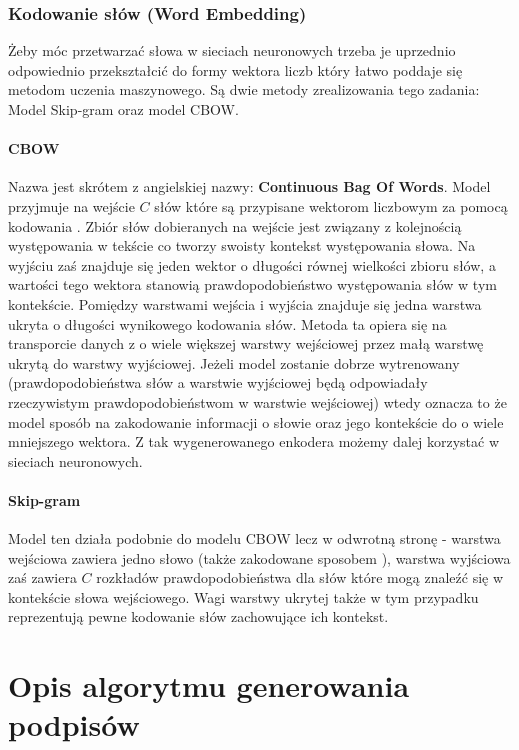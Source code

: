\subsubsection{Kodowanie słów (Word Embedding)}
Żeby móc przetwarzać słowa w sieciach neuronowych trzeba je uprzednio odpowiednio przekształcić do formy wektora liczb który łatwo poddaje się metodom uczenia maszynowego. Są dwie metody zrealizowania tego zadania: Model Skip-gram oraz model CBOW.
\paragraph{CBOW}
Nazwa jest skrótem z angielskiej nazwy: \textbf{Continuous Bag Of Words}.
Model przyjmuje na wejście $C$ słów które są przypisane wektorom liczbowym za pomocą kodowania . Zbiór słów dobieranych na wejście jest związany z kolejnością występowania w tekście co tworzy swoisty kontekst występowania słowa. Na wyjściu zaś znajduje się jeden wektor o długości równej wielkości zbioru słów, a wartości tego wektora stanowią prawdopodobieństwo występowania słów w tym kontekście. Pomiędzy warstwami wejścia i wyjścia znajduje się jedna warstwa ukryta o długości wynikowego kodowania słów. Metoda ta opiera się na transporcie danych z o wiele większej warstwy wejściowej przez małą warstwę ukrytą do warstwy wyjściowej. Jeżeli model zostanie dobrze wytrenowany (prawdopodobieństwa słów a warstwie wyjściowej będą odpowiadały rzeczywistym prawdopodobieństwom w warstwie wejściowej) wtedy oznacza to że model  sposób na zakodowanie informacji o słowie oraz jego kontekście do o wiele mniejszego wektora. Z tak wygenerowanego enkodera możemy dalej korzystać w sieciach neuronowych. \cite[p.~1,3]{word-embed}
\paragraph{Skip-gram}
Model ten działa podobnie do modelu CBOW lecz w odwrotną stronę - warstwa wejściowa zawiera jedno słowo (także zakodowane sposobem ), warstwa wyjściowa zaś zawiera $C$ rozkładów prawdopodobieństwa dla słów które mogą znaleźć się w kontekście słowa wejściowego. Wagi warstwy ukrytej także w tym przypadku reprezentują pewne kodowanie słów zachowujące ich kontekst.

\newpage

\section{Opis algorytmu generowania podpisów}

